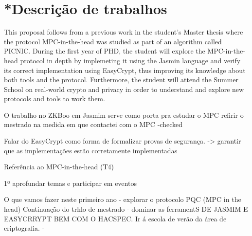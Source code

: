\documentclass[preprint]{iacrtrans}
\begin{document}
\section{*Descrição de trabalhos}


This proposal follows from a previous work in the student's Master thesis where the protocol MPC-in-the-head was studied as part of an algorithm called PICNIC.
During the first year of PHD, the student will explore the MPC-in-the-head protocol in depth by implemeting it using the Jasmin language and verify its correct implementation using EasyCrypt, thus improving its knowledge about both tools and the protocol. Furthermore, the student will attend the Summer School on real-world crypto and privacy in order to understand and explore new protocols and tools to work them. 




O trabalho no ZKBoo em Jasmim serve como porta pra estudar o MPC
refirir o mestrado na medida em que contactei com o MPC                  -checked

Falar do EasyCrypt como forma de formalizar provas de segurança. -> garantir que as implementações estão corretamente implementadas  



Referência ao MPC-in-the-head (T4)


1º aprofundar temas e participar em eventos

O que vamos fazer neste primeiro ano - explorar o protocolo PQC (MPC in the head)
Continuação do trhlo  de mestrado - dominar as ferramentS DE JASMIM E EASYCRRYPT BEM COM O HACSPEC.
Ir á escola de verão da área de criptografia. - 








\printbibliography{}
\end{document}
